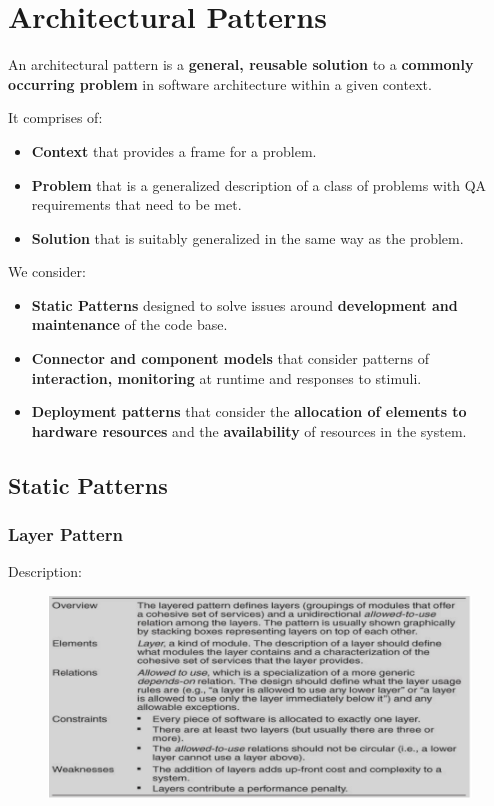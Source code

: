 \documentclass[a4paper]{article}
\begin{document}
\section{Architectural Patterns}
An architectural pattern is a \textbf{general, reusable solution} to a \textbf{commonly occurring problem} in software architecture within a given context.

It comprises of:
\begin{itemize}
\item
  \textbf{Context} that provides a frame for a problem.
\item
  \textbf{Problem} that is a generalized description of a class of problems with
  QA requirements that need to be met.
\item
  \textbf{Solution} that is suitably generalized in the same way as the problem.\\
 
\end{itemize}


We consider:
\begin{itemize}
\item
  \textbf{Static Patterns} designed to solve issues around \textbf{development and maintenance} of
  the code base.
\item
  \textbf{Connector and component models} that consider patterns of \textbf{interaction,
  monitoring} at runtime and responses to stimuli.
\item
  \textbf{Deployment patterns} that consider the \textbf{allocation of elements to hardware
  resources} and the \textbf{availability} of resources in the system.
\end{itemize}

\subsection{Static Patterns}
\subsubsection{Layer Pattern}

Description:
\begin{figure}[H]
\centering
  \includegraphics[width=1\linewidth]{images/layered.png}
\end{figure}
\end{document}
